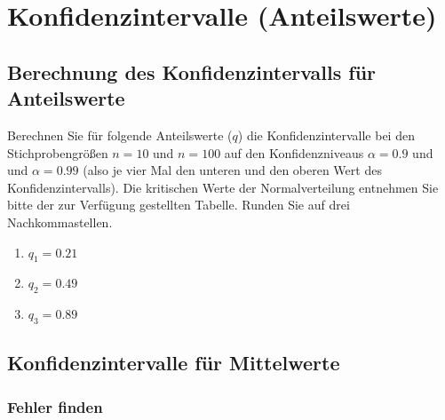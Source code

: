 \section{Konfidenzintervalle (Anteilswerte)}

\subsection{Berechnung des Konfidenzintervalls für Anteilswerte}

Berechnen Sie für folgende Anteilswerte ($q$) die Konfidenzintervalle bei den Stichprobengrößen $n=10$ und $n=100$ auf den Konfidenzniveaus $\alpha=0.9$ und und $\alpha=0.99$ (also je vier Mal den unteren und den oberen Wert des Konfidenzintervalls).
Die kritischen Werte der Normalverteilung entnehmen Sie bitte der zur Verfügung gestellten Tabelle.
Runden Sie auf drei Nachkommastellen.

\begin{enumerate}
  \item $q_1=0.21$ 
  \item $q_2=0.49$
  \item $q_3=0.89$
\end{enumerate}



\subsection{Konfidenzintervalle für Mittelwerte}

\subsubsection{Fehler finden}

